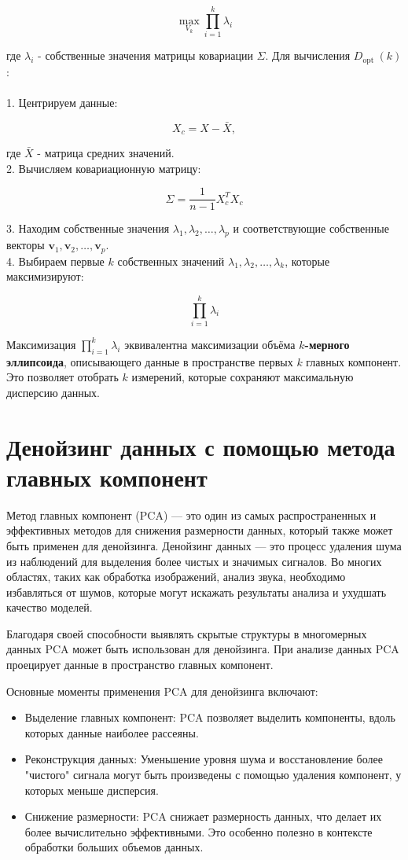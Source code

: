 $$
\max _{V_k} \prod_{i=1}^k \lambda_i
$$


где $\lambda_i$ - собственные значения матрицы ковариации $\Sigma$.
Для вычисления $D_{\text {opt }}(k)$ :\\
\\
1. Центрируем данные:

$$
X_c=X-\bar{X},
$$


где $\bar{X}$ - матрица средних значений.\\
2. Вычисляем ковариационную матрицу:

$$
\Sigma=\frac{1}{n-1} X_c^T X_c
$$

3. Находим собственные значения $\lambda_1, \lambda_2, \ldots, \lambda_p$ и соответствующие собственные векторы $\mathbf{v}_1, \mathbf{v}_2, \ldots, \mathbf{v}_p$.\\
4. Выбираем первые $k$ собственных значений $\lambda_1, \lambda_2, \ldots, \lambda_k$, которые максимизируют:

$$
\prod_{i=1}^k \lambda_i
$$

Максимизация $\prod_{i=1}^k \lambda_i$ эквивалентна максимизации объёма \textbf{$k$-мерного эллипсоида}, описывающего данные в пространстве первых $k$ главных компонент. Это позволяет отобрать $k$ измерений, которые сохраняют максимальную дисперсию данных.


\section{Денойзинг данных с помощью метода главных компонент}
Метод главных компонент (PCA) — это один из самых распространенных и эффективных методов для снижения размерности данных, который также может быть применен для денойзинга. Денойзинг данных — это процесс удаления шума из наблюдений для выделения более чистых и значимых сигналов. Во многих областях, таких как обработка изображений, анализ звука, необходимо избавляться от шумов, которые могут искажать результаты анализа и ухудшать качество моделей.

Благодаря своей способности выявлять скрытые структуры в многомерных данных PCA может быть использован для денойзинга. При анализе данных PCA проецирует данные в пространство главных компонент. 

Основные моменты применения PCA для денойзинга включают:
\begin{itemize}
\item Выделение главных компонент: 
PCA позволяет выделить компоненты, вдоль которых данные наиболее рассеяны.

\item Реконструкция данных: Уменьшение уровня шума и восстановление более "чистого" сигнала могут быть произведены с помощью удаления компонент, у которых меньше дисперсия. 

\item Снижение размерности: PCA снижает размерность данных, что делает их более вычислительно эффективными. Это особенно полезно в контексте обработки больших объемов данных.
\end{itemize}

